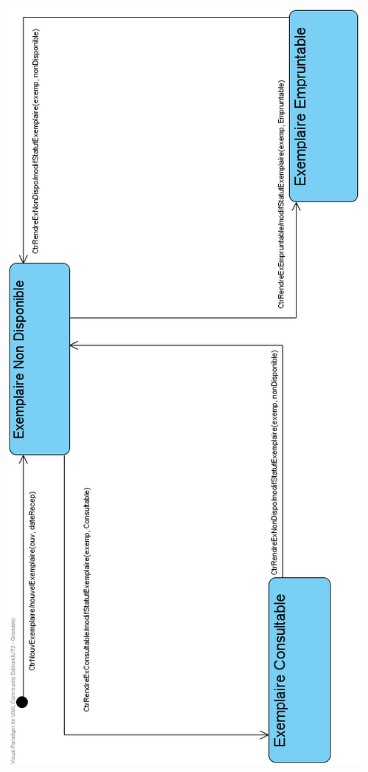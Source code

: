 \documentclass[a4paper,10pt]{report}
\begin{document}
\bigskip
\includegraphics[height=200mm]{ETExemplaire.png}
\newpage
\end{document}
